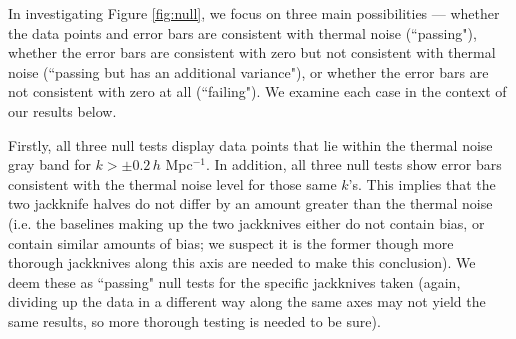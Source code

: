 \documentclass[preprint2,numberedappendix,tighten]{aastex6}  %
\begin{document}

In investigating Figure \ref{fig:null}, we focus on three main possibilities --- whether the data points and error bars are consistent with thermal noise (``passing"), whether the error bars are consistent with zero but not consistent with thermal noise (``passing but has an additional variance"), or whether the error bars are not consistent with zero at all (``failing"). We examine each case in the context of our results below.

Firstly, all three null tests display data points that lie within the thermal noise gray band for $k > \pm 0.2$\,$h$ Mpc$^{-1}$. In addition, all three null tests show error bars consistent with the thermal noise level for those same $k$'s. This implies that the two jackknife halves do not differ by an amount greater than the thermal noise (i.e. the baselines making up the two jackknives either do not contain bias, or contain similar amounts of bias; we suspect it is the former though more thorough jackknives along this axis are needed to make this conclusion). We deem these as ``passing" null tests for the specific jackknives taken (again, dividing up the data in a different way along the same axes may not yield the same results, so more thorough testing is needed to be sure).
\end{document}
